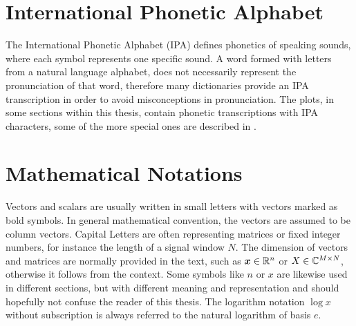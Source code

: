
\section{International Phonetic Alphabet}\label{sec:appendix_ipa}
The International Phonetic Alphabet (IPA) defines phonetics of speaking sounds, where each symbol represents one specific sound.
A word formed with letters from a natural language alphabet, does not necessarily represent the pronunciation of that word, therefore many dictionaries provide an IPA transcription in order to avoid misconceptions in pronunciation.
The plots, in some sections within this thesis, contain phonetic transcriptions with IPA characters, some of the more special ones are described in .




\section{Mathematical Notations}\label{sec:appendix_math}
Vectors and scalars are usually written in small letters with vectors marked as bold symbols.
In general mathematical convention, the vectors are assumed to be column vectors.
Capital Letters are often representing matrices or fixed integer numbers, for instance the length of a signal window $N$.
The dimension of vectors and matrices are normally provided in the text, such as $\bm{x} \in \mathbb{R}^n$ or $X \in \mathbb{C}^{M \times N}$, otherwise it follows from the context.
Some symbols like $n$ or $x$ are likewise used in different sections, but with different meaning and representation and should hopefully not confuse the reader of this thesis.
The logarithm notation $\log x$ without subscription is always referred to the natural logarithm of basis $e$.